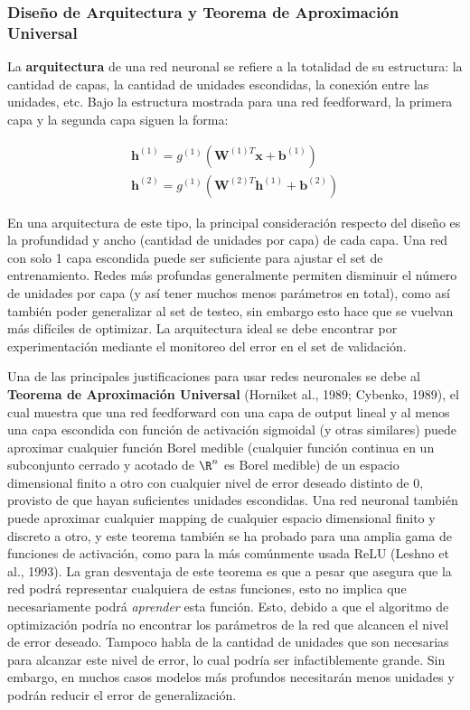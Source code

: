 \subsubsection{Dise\~{n}o de Arquitectura y Teorema de Aproximaci\'on Universal}

La \textbf{arquitectura} de una red neuronal se refiere a la totalidad de su estructura: la cantidad de capas, la cantidad de unidades escondidas, la conexi\'on entre las unidades, etc. Bajo la estructura mostrada para una red feedforward, la primera capa y la segunda capa siguen la forma:

\begin{equation}
\begin{split}
\bm{h}^{(1)} = g^{(1)}(\bm{W}^{(1) T}\bm{x} + \bm{b}^{(1)}) 
\\
\bm{h}^{(2)} = g^{(1)}(\bm{W}^{(2) T}\bm{h}^{(1)} + \bm{b}^{(2)})
\end{split}
\end{equation}

En una arquitectura de este tipo, la principal consideraci\'on respecto del dise\~{n}o es la profundidad y ancho (cantidad de unidades por capa) de cada capa. Una red con solo 1 capa escondida puede ser suficiente para ajustar el set de entrenamiento. Redes m\'as profundas generalmente permiten disminuir el n\'umero de unidades por capa (y as\'i tener muchos menos par\'ametros en total), como as\'i tambi\'en poder generalizar al set de testeo, sin embargo esto hace que se vuelvan m\'as dif\'iciles de optimizar. La arquitectura ideal se debe encontrar por experimentaci\'on mediante el monitoreo del error en el set de validaci\'on.

Una de las principales justificaciones para usar redes neuronales se debe al \textbf{Teorema de Aproximaci\'on Universal} (Horniket al., 1989; Cybenko, 1989), el cual muestra que una red feedforward con una capa de output lineal y al menos una capa escondida con funci\'on de activaci\'on sigmoidal (y otras similares) puede aproximar cualquier funci\'on Borel medible (cualquier funci\'on continua en un subconjunto cerrado y acotado de $\R^{n}$ es Borel medible) de un espacio dimensional finito a otro con cualquier nivel de error deseado distinto de 0, provisto de que hayan suficientes unidades escondidas. Una red neuronal tambi\'en puede aproximar cualquier mapping  de cualquier espacio dimensional finito y discreto a otro, y este teorema tambi\'en se ha probado para una amplia gama de funciones de activaci\'on, como para la m\'as com\'unmente usada ReLU (Leshno et al., 1993). La gran desventaja de este teorema es que a pesar que asegura que la red podr\'a representar cualquiera de estas funciones, esto no implica que necesariamente podr\'a \textit{aprender} esta funci\'on. Esto, debido a que el algoritmo de optimizaci\'on podr\'ia no encontrar los par\'ametros de la red que alcancen el nivel de error deseado. Tampoco habla de la cantidad de unidades que son necesarias para alcanzar este nivel de error, lo cual podr\'ia ser infactiblemente grande. Sin embargo, en muchos casos modelos m\'as profundos necesitar\'an menos unidades y podr\'an reducir el error de generalizaci\'on.

